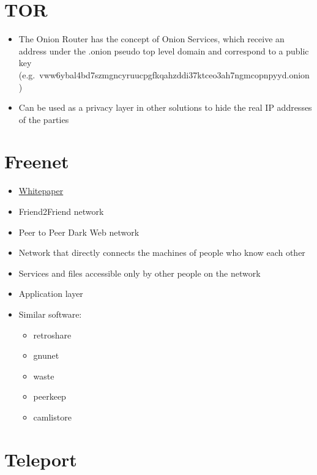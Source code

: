 \hypertarget{tor}{%
\section{TOR}\label{tor}}

\begin{itemize}
\tightlist
\item
  The Onion Router has the concept of Onion Services, which receive an
  address under the .onion pseudo top level domain and correspond to a
  public key
  (e.g.~vww6ybal4bd7szmgncyruucpgfkqahzddi37ktceo3ah7ngmcopnpyyd.onion)
\item
  Can be used as a privacy layer in other solutions to hide the real IP
  addresses of the parties
\end{itemize}

\hypertarget{freenet}{%
\section{Freenet}\label{freenet}}

\begin{itemize}
\tightlist
\item
  \href{https://homepage.divms.uiowa.edu/~ghosh/freenet.pdf}{Whitepaper}
\item
  Friend2Friend network
\item
  Peer to Peer Dark Web network
\item
  Network that directly connects the machines of people who know each
  other
\item
  Services and files accessible only by other people on the network
\item
  Application layer
\item
  Similar software:

  \begin{itemize}
  \tightlist
  \item
    retroshare
  \item
    gnunet
  \item
    waste
  \item
    peerkeep
  \item
    camlistore
  \end{itemize}
\end{itemize}

\hypertarget{teleport}{%
\section{Teleport}\label{teleport}}

